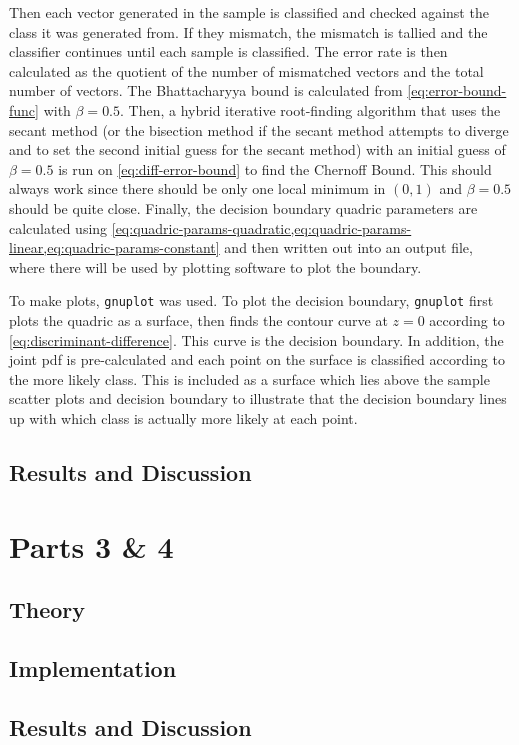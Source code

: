 \documentclass[headings=optiontoheadandtoc,listof=totoc,parskip=full]{scrartcl}
\begin{document}
Then each vector generated in the sample is classified and checked against the class it was generated from. If they mismatch, the mismatch is tallied and the classifier continues until each sample is classified. The error rate is then calculated as the quotient of the number of mismatched vectors and the total number of vectors. The Bhattacharyya bound is calculated from \cref{eq:error-bound-func} with $\beta = 0.5$. Then, a hybrid iterative root-finding algorithm that uses the secant method (or the bisection method if the secant method attempts to diverge and to set the second initial guess for the secant method) with an initial guess of $\beta = 0.5$ is run on \cref{eq:diff-error-bound} to find the Chernoff Bound. This should always work since there should be only one local minimum in $(0,1)$ and $\beta = 0.5$ should be quite close. Finally, the decision boundary quadric parameters are calculated using \cref{eq:quadric-params-quadratic,eq:quadric-params-linear,eq:quadric-params-constant} and then written out into an output file, where there will be used by plotting software to plot the boundary.

To make plots, \texttt{gnuplot} was used. To plot the decision boundary, \texttt{gnuplot} first plots the quadric as a surface, then finds the contour curve at $z = 0$ according to \cref{eq:discriminant-difference}. This curve is the decision boundary. In addition, the joint pdf is pre-calculated and each point on the surface is classified according to the more likely class. This is included as a surface which lies above the sample scatter plots and decision boundary to illustrate that the decision boundary lines up with which class is actually more likely at each point.

\subsection{Results and Discussion}


\section{Parts 3 \& 4}
\label{sec:part-2}

\subsection{Theory}
\label{sec:part-2-theory}

\subsection{Implementation}
\label{sec:part-2-impl}


\subsection{Results and Discussion}
\end{document}
